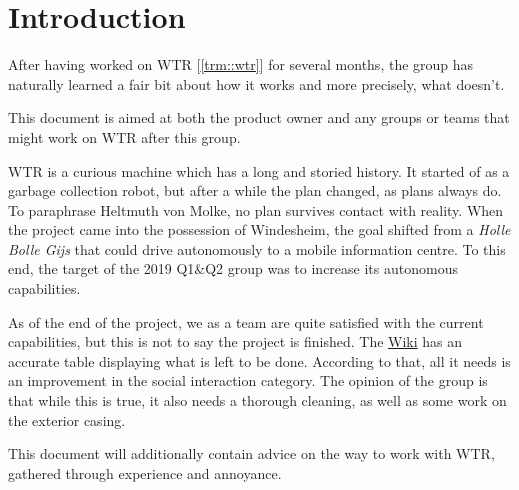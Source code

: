 \section{Introduction}
\label{sec::intro}

After having worked on WTR [\ref{trm::wtr}] for several months, the group has naturally learned a fair bit about how it works and more precisely, what doesn't.

This document is aimed at both the product owner and any groups or teams that might work on WTR after this group.

WTR is a curious machine which has a long and storied history.
It started of as a garbage collection robot, but after a while the plan changed, as plans always do.
To paraphrase Heltmuth von Molke, no plan survives contact with reality.
When the project came into the possession of Windesheim, the goal shifted from a \textit{Holle Bolle Gijs} that could drive autonomously to a mobile information centre.
To this end, the target of the 2019 Q1\&Q2 group was to increase its autonomous capabilities.

As of the end of the project, we as a team are quite satisfied with the current capabilities, but this is not to say the project is finished.
The \href{https://windesheim-willy.github.io/WillyWiki/}{Wiki} has an accurate table displaying what is left to be done.
According to that, all it needs is an improvement in the social interaction category.
The opinion of the group is that while this is true, it also needs a thorough cleaning, as well as some work on the exterior casing.

This document will additionally contain advice on the way to work with WTR, gathered through experience and annoyance.
\newpage 